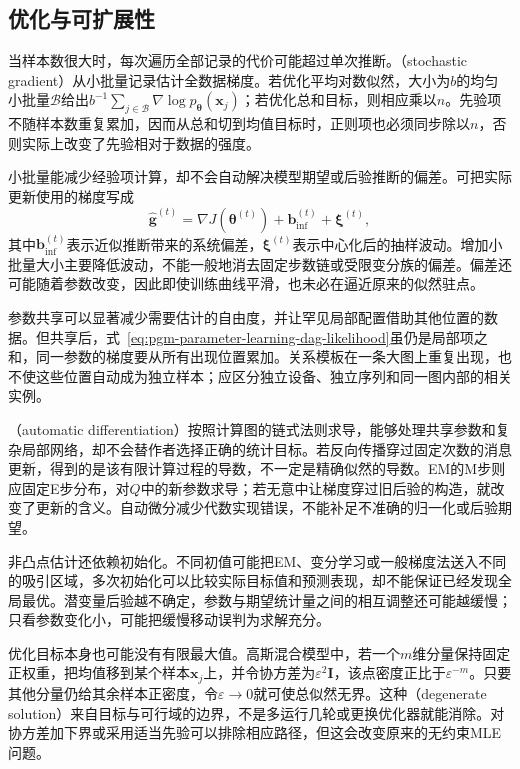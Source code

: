 \subsection{优化与可扩展性}
\label{sec:pgm-parameter-learning-scalability}

当样本数很大时，每次遍历全部记录的代价可能超过单次推断。（stochastic gradient）从小批量记录估计全数据梯度。若优化平均对数似然，大小为$b$的均匀小批量$\mathcal{B}$给出$b^{-1}\sum_{j\in\mathcal{B}}\nabla\log p_{\bm{\theta}}(\bm{x}_j)$；若优化总和目标，则相应乘以$n$。先验项不随样本数重复累加，因而从总和切到均值目标时，正则项也必须同步除以$n$，否则实际上改变了先验相对于数据的强度。

小批量能减少经验项计算，却不会自动解决模型期望或后验推断的偏差。可把实际更新使用的梯度写成
\[
  \widehat{\bm{g}}^{(t)}
   =\nabla J(\bm{\theta}^{(t)})
      +\bm{b}_{\mathrm{inf}}^{(t)}
      +\bm{\xi}^{(t)},
\]
其中$\bm{b}_{\mathrm{inf}}^{(t)}$表示近似推断带来的系统偏差，$\bm{\xi}^{(t)}$表示中心化后的抽样波动。增加小批量大小主要降低波动，不能一般地消去固定步数链或受限变分族的偏差。偏差还可能随着参数改变，因此即使训练曲线平滑，也未必在逼近原来的似然驻点。

参数共享可以显著减少需要估计的自由度，并让罕见局部配置借助其他位置的数据。但共享后，式~\eqref{eq:pgm-parameter-learning-dag-likelihood}虽仍是局部项之和，同一参数的梯度要从所有出现位置累加。关系模板在一条大图上重复出现，也不使这些位置自动成为独立样本；应区分独立设备、独立序列和同一图内部的相关实例。

（automatic differentiation）按照计算图的链式法则求导，能够处理共享参数和复杂局部网络，却不会替作者选择正确的统计目标。若反向传播穿过固定次数的消息更新，得到的是该有限计算过程的导数，不一定是精确似然的导数。EM的M步则应固定E步分布，对$Q$中的新参数求导；若无意中让梯度穿过旧后验的构造，就改变了更新的含义。自动微分减少代数实现错误，不能补足不准确的归一化或后验期望。

非凸点估计还依赖初始化。不同初值可能把EM、变分学习或一般梯度法送入不同的吸引区域，多次初始化可以比较实际目标值和预测表现，却不能保证已经发现全局最优。潜变量后验越不确定，参数与期望统计量之间的相互调整还可能越缓慢；只看参数变化小，可能把缓慢移动误判为求解充分。

优化目标本身也可能没有有限最大值。高斯混合模型中，若一个$m$维分量保持固定正权重，把均值移到某个样本$\bm{x}_j$上，并令协方差为$\varepsilon^2\bm{I}$，该点密度正比于$\varepsilon^{-m}$。只要其他分量仍给其余样本正密度，令$\varepsilon\to0$就可使总似然无界。这种（degenerate solution）来自目标与可行域的边界，不是多运行几轮或更换优化器就能消除。对协方差加下界或采用适当先验可以排除相应路径，但这会改变原来的无约束MLE问题。

